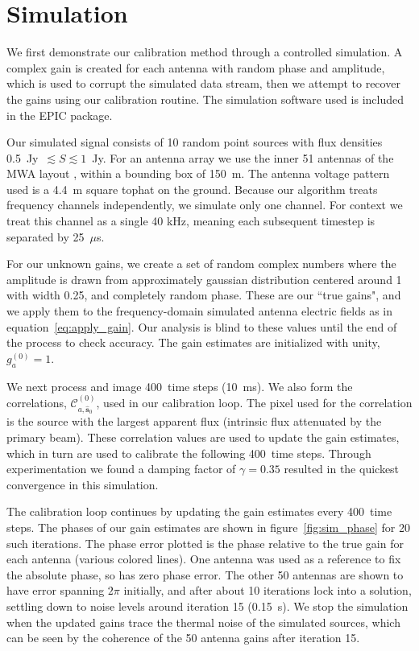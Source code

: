 \documentclass[a4paper,fleqn,usenatbib]{mnras}
\newcommand{\spix}{\ensuremath{\hat{\mathbf{s}}_{0}}}
\newcommand{\Cna}[1][n]{\ensuremath{\mathcal{C}^{(#1)}_{a,\spix}}}
\newcommand{\caliter}{400}
\newcommand{\damp}{\ensuremath{\gamma}}
\begin{document}
\section{Simulation}\label{sec:sim}
We first demonstrate our calibration method through a controlled simulation. A complex gain is created for each antenna with random phase and amplitude, which is used to corrupt the simulated data stream, then we attempt to recover the gains using our calibration routine. The simulation software used is included in the EPIC package.

Our simulated signal consists of 10 random point sources with flux densities 0.5~Jy~$\lesssim S \lesssim 1$~Jy. For an antenna array we use the inner 51 antennas of the MWA layout \citep{bea12}, within a bounding box of 150~m. The antenna voltage pattern used is a 4.4~m square tophat on the ground. Because our algorithm treats frequency channels independently, we simulate only one channel. For context we treat this channel as a single 40 kHz, meaning each subsequent timestep is separated by 25~$\mu$s.

For our unknown gains, we create a set of random complex numbers where the amplitude is drawn from approximately gaussian distribution centered around 1 with width 0.25, and completely random phase. These are our ``true gains", and we apply them to the frequency-domain simulated antenna electric fields as in equation~\ref{eq:apply_gain}. Our analysis is blind to these values until the end of the process to check accuracy. The gain estimates are initialized with unity, $g^{(0)}_a=1$.

We next process and image \caliter~time steps (10~ms). We also form the correlations, \Cna[0], used in our calibration loop. The pixel used for the correlation is the source with the largest apparent flux (intrinsic flux attenuated by the primary beam). These correlation values are used to update the gain estimates, which in turn are used to calibrate the following \caliter~time steps. Through experimentation we found a damping factor of $\damp=0.35$ resulted in the quickest convergence in this simulation.

The calibration loop continues by updating the gain estimates every \caliter~time steps. The phases of our gain estimates are shown in figure~\ref{fig:sim_phase} for 20 such iterations. The phase error plotted is the phase relative to the true gain for each antenna (various colored lines). One antenna was used as a reference to fix the absolute phase, so has zero phase error. The other 50 antennas are shown to have error spanning $2\pi$ initially, and after about 10 iterations lock into a solution, settling down to noise levels around iteration 15 (0.15~s). We stop the simulation when the updated gains trace the thermal noise of the simulated sources, which can be seen by the coherence of the 50 antenna gains after iteration 15.
\end{document}
